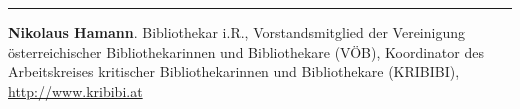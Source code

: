 \begin{center}\rule{0.5\linewidth}{\linethickness}\end{center}

\textbf{Nikolaus Hamann}. Bibliothekar i.R., Vorstandsmitglied der
Vereinigung österreichischer Bibliothekarinnen und Bibliothekare (VÖB),
Koordinator des Arbeitskreises kritischer Bibliothekarinnen und
Bibliothekare (KRIBIBI), \url{http://www.kribibi.at}
